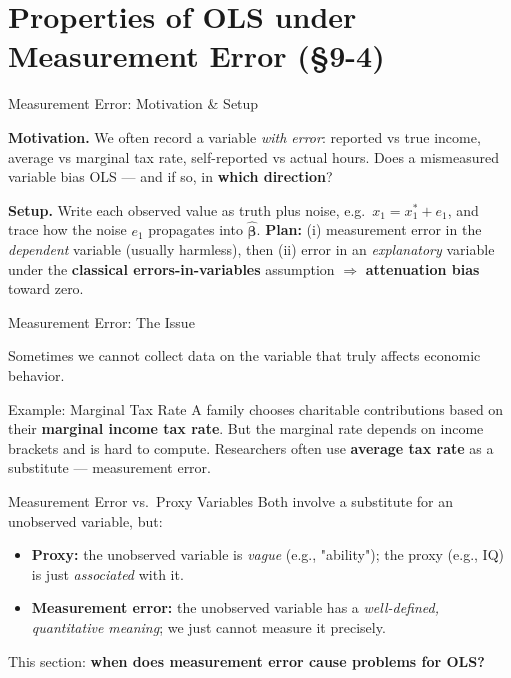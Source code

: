 \documentclass[aspectratio=169, 12pt]{beamer}
\begin{document}
\section{Properties of OLS under Measurement Error (\S9-4)}

\begin{frame}{Measurement Error: Motivation \& Setup}

  \begin{highlightbox}
    \textbf{Motivation.} We often record a variable \emph{with error}: reported vs
    true income, average vs marginal tax rate, self-reported vs actual hours. Does a
    mismeasured variable bias OLS --- and if so, in \textbf{which direction}?
  \end{highlightbox}

  \begin{keybox}
    \textbf{Setup.} Write each observed value as truth plus noise, e.g.\
    $x_1 = x_1^{*} + e_1$, and trace how the noise $e_1$ propagates into
    $\hat{\boldsymbol\beta}$. \textbf{Plan:} (i) measurement error in the
    \emph{dependent} variable (usually harmless), then (ii) error in an
    \emph{explanatory} variable under the \textbf{classical errors-in-variables}
    assumption $\Rightarrow$ \textbf{attenuation bias} toward zero.
  \end{keybox}

\end{frame}

\begin{frame}[shrink=20]{Measurement Error: The Issue}

  Sometimes we cannot collect data on the variable that truly affects economic behavior.

  \begin{examplebox}{Example: Marginal Tax Rate}
    A family chooses charitable contributions based on their \textbf{marginal income tax rate}.
    But the marginal rate depends on income brackets and is hard to compute.
    Researchers often use \textbf{average tax rate} as a substitute — measurement error.
  \end{examplebox}

  \begin{definitionbox}{Measurement Error vs.\ Proxy Variables}
    Both involve a substitute for an unobserved variable, but:
    \begin{itemize}\setlength{\itemsep}{1pt}
      \item \textbf{Proxy:} the unobserved variable is \emph{vague} (e.g., "ability"); the
      proxy (e.g., IQ) is just \emph{associated} with it.
      \item \textbf{Measurement error:} the unobserved variable has a \emph{well-defined,
      quantitative meaning}; we just cannot measure it precisely.
    \end{itemize}
  \end{definitionbox}

  This section: \textbf{when does measurement error cause problems for OLS?}

\end{frame}
\end{document}
